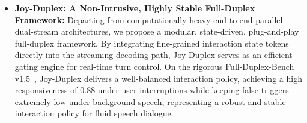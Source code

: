 \begin{itemize}
    \item \textbf{Joy-Duplex: A Non-Intrusive, Highly Stable Full-Duplex Framework:} 
    Departing from computationally heavy end-to-end parallel dual-stream architectures, we propose a modular, state-driven, plug-and-play full-duplex framework. By integrating fine-grained interaction state tokens directly into the streaming decoding path, Joy-Duplex serves as an efficient gating engine for real-time turn control. On the rigorous Full-Duplex-Bench v1.5~\cite{lin2026fullduplexv1.5}, Joy-Duplex delivers a well-balanced interaction policy, achieving a high responsiveness of 0.88 under user interruptions while keeping false triggers extremely low under background speech, representing a robust and stable interaction policy for fluid speech dialogue.
\end{itemize}